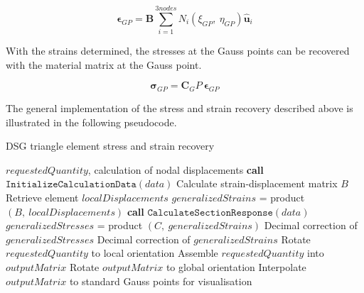 \begin{equation} 
\boldsymbol{\epsilon}_{GP} = \mathbf{B} \sum_{i=1}^{3 nodes} N_i(\xi_{GP},\ \eta_{GP}) \hat{\mathbf{u}}_i
\label{eqt20}
\end{equation}

With the strains determined, the stresses at the Gauss points can be recovered with the material matrix at the Gauss point.

\begin{equation} 
\boldsymbol{\sigma}_{GP} = \mathbf{C}_GP\ \boldsymbol{\epsilon}_{GP}
\label{eqt21}
\end{equation}

The general implementation of the stress and strain recovery described above is illustrated in the following pseudocode.

\begin{algorithm}
	\caption{DSG triangle element stress and strain recovery}
	\label{DSG triangle element stress and strain recovery}
	\begin{algorithmic}[1]
		\Require $requestedQuantity$, calculation of nodal displacements
		\State \textbf{call} $\texttt{InitializeCalculationData}(data)$
		\State \hspace{\algorithmicindent}Calculate strain-displacement matrix $B$
		\State \hspace{\algorithmicindent}Retrieve element $localDisplacements$
		\State $generalizedStrains$ = product$(B,\ localDisplacements)$
				\State \textbf{call} $\texttt{CalculateSectionResponse}(data)$
				\State $generalizedStresses$ = product $(C,\ generalizedStrains)$
				\State Decimal correction of $generalizedStresses$
		\EndIf
		\State Decimal correction of $generalizedStrains$ 
				\State Rotate $requestedQuantity$ to local orientation
		\EndIf
		\State Assemble $requestedQuantity$ into $outputMatrix$
				\State Rotate $outputMatrix$ to global orientation
		\EndIf
		\State Interpolate $outputMatrix$ to standard Gauss points for visualisation
	\end{algorithmic}
\end{algorithm}